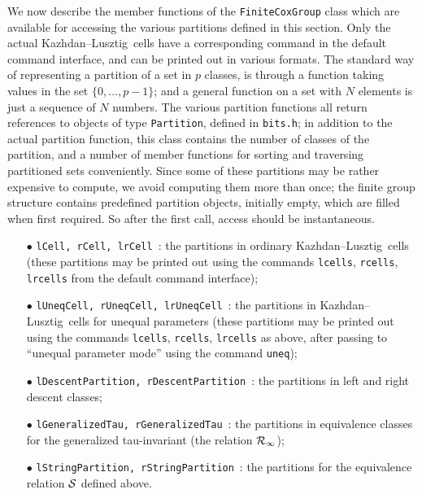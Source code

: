 \documentclass[11pt]{article}
\newcommand{\kl}{Kazh\-dan--Lusz\-tig}
\newcommand{\Rc}{{\cal R}}
\newcommand{\Sc}{{\cal S}}
\begin{document}
We now describe the member functions of the {\tt FiniteCoxGroup} class which
are available for accessing the various partitions defined in this section.
Only the actual \kl\ cells have a corresponding command in the default
command interface, and can be printed out in various formats. The standard
way of representing a partition of a set in $p$ classes, is through a function
taking values in the set $\{0,\ldots,p-1\}$; and a general function on a set
with $N$ elements is just a sequence of $N$ numbers. The various partition
functions all return references to objects of type {\tt Partition}, defined
in {\tt bits.h}; in addition to the actual partition function, this class
contains the number of classes of the partition, and a number of member
functions for sorting and traversing partitioned sets conveniently. Since
some of these partitions may be rather expensive to compute, we avoid
computing them more than once; the finite group structure contains predefined
partition objects, initially empty, which are filled when first required. So
after the first call, access should be instantaneous.

\begin{itemize}\itemsep0pt
\item[$\bullet$]{\tt lCell, rCell, lrCell}~: the partitions in ordinary \kl\
cells (these partitions may be printed out using the commands {\tt lcells},
{\tt rcells}, {\tt lrcells} from the default command interface);
\item[$\bullet$]{\tt lUneqCell, rUneqCell, lrUneqCell}~: the partitions in
\kl\ cells for unequal parameters (these partitions may be printed out
using the commands {\tt lcells}, {\tt rcells}, {\tt lrcells} as above, after
passing to ``unequal parameter mode'' using the command {\tt uneq});
\item[$\bullet$]{\tt lDescentPartition, rDescentPartition}~: the partitions
in left and right descent classes;
\item[$\bullet$]{\tt lGeneralizedTau, rGeneralizedTau}~: the partitions in
equivalence classes for the generalized tau-invariant (the relation
$\Rc_\infty$);
\item[$\bullet$]{\tt lStringPartition, rStringPartition}~: the partitions
for the equivalence relation $\Sc$ defined above.
\end{itemize}
\end{document}
